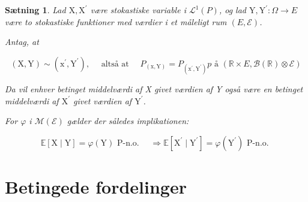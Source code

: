 \documentclass{article}
\newcommand{\1}{\mathbbm{1}}
\theoremstyle{boxed}
\newtheorem{proposition}[theorem]{Sætning}
\begin{document}
\begin{theorem-box}
    \begin{proposition}
        Lad $\mathrm{X}, \mathrm{X}^{\prime}$ være stokastiske variable i $\mathcal{L}^1(P)$, og lad $\mathrm{Y}, \mathrm{Y}^{\prime}: \Omega \rightarrow E$ være to stokastiske funktioner med værdier i et måleligt rum $(E, \mathcal{E})$.

Antag, at

$$
(\mathrm{X}, \mathrm{Y}) \sim\left(\mathrm{x}^{\prime}, \mathrm{Y}^{\prime}\right), \quad \text { altså at } \quad P_{(\mathrm{x}, \mathrm{Y})}=P_{\left(\mathrm{x}^{\prime}, \mathrm{Y}^{\prime}\right)} p \text { å }(\mathbb{R} \times E, \mathcal{B}(\mathbb{R}) \otimes \mathcal{E})
$$

Da vil enhver betinget middelværdi af X givet værdien af Y også være en betinget middelværdi af $\mathrm{X}^{\prime}$ givet værdien af $\mathrm{Y}^{\prime}$.

For $\varphi$ i $\mathcal{M}(\mathcal{E})$ gælder der således implikationen:

$$
\mathbb{E}[\mathrm{X} \mid \mathrm{Y}]=\varphi(\mathrm{Y}) \text { P-n.o. } \quad \Longrightarrow \mathbb{E}\left[\mathrm{X}^{\prime} \mid \mathrm{Y}^{\prime}\right]=\varphi\left(\mathrm{Y}^{\prime}\right) \text { P-n.o. }
$$
    \end{proposition}
\end{theorem-box}
\section{Betingede fordelinger}
\end{document}

